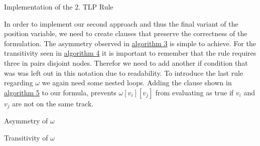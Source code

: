 \documentclass[bachelor, english]{algothesis}
\begin{document}
\begin{algorithm}[ht]
    \caption{Implementation of the 2. TLP Rule}
    \label{alg:second_rule}
\end{algorithm}
\noindent
In order to implement our second approach and thus the final variant of the position variable, we need to create clauses that preserve the correctness of the formulation. The asymmetry observed in \hyperlink{alg:assymetric}{algorithm 3} is simple to achieve. For the transitivity seen in \hyperlink{alg:transitivity}{algorithm 4} it is important to remember that the rule requires three in pairs disjoint nodes. Therefor we need to add another if condition that was was left out in this notation due to readability. To introduce the last rule regarding $\omega$ we again need some nested loops. Adding the clause shown in \hyperlink{alg:edgeCase}{algorithm 5} to our formula, prevents $\omega[v_i][v_j]$ from evaluating as true if $v_i$ and $v_j$ are not on the same track.
\begin{algorithm}[ht]
    \caption{Asymmetry of $\omega$}
    \label{alg:assymetric}
\end{algorithm}

\begin{algorithm}[ht]
    \caption{Transitivity of $\omega$}
    \label{alg:transitivity}
\end{algorithm}
\end{document}
